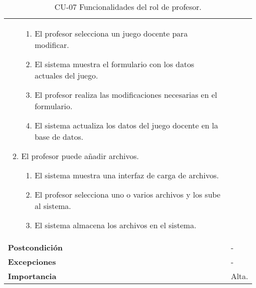 \begin{table}[p]
\begin{tabularx}{\linewidth}{ p{} p{} }
\begin{enumerate}
\begin{enumerate}
    		\item El profesor selecciona un juego docente para modificar.
    		\item El sistema muestra el formulario con los datos actuales del juego.
    		\item El profesor realiza las modificaciones necesarias en el formulario.
            \item El sistema actualiza los datos del juego docente en la base de datos.
    	\end{enumerate}
    \item El profesor puede añadir archivos.
    	\begin{enumerate}
    		\renewcommand{\labelenumii}{\arabic{enumi}.\arabic{enumii}}
    		\item El sistema muestra una interfaz de carga de archivos.
    		\item El profesor selecciona uno o varios archivos y los sube al sistema.
    		\item El sistema almacena los archivos en el sistema.
    	\end{enumerate}

		\end{enumerate}\\
         \textbf{Postcondición}             & - \\
		\textbf{Excepciones}             & - \\
		\textbf{Importancia}          & Alta. \\
		\bottomrule
	\end{tabularx}
	\caption{CU-07  Funcionalidades del rol de profesor.}
\end{table}

